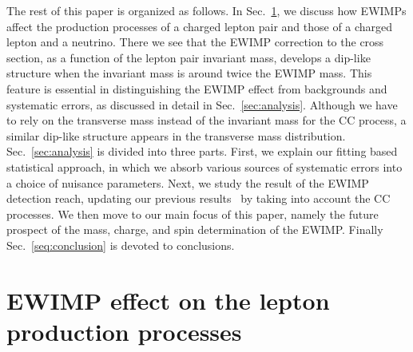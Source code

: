 \documentclass[12pt, a4paper]{article}
\begin{document}
The rest of this paper is organized as follows.  In
Sec.~\ref{sec:ewimp}, we discuss how EWIMPs affect the production
processes of a charged lepton pair and those of a charged lepton and a
neutrino.  There we see that the EWIMP correction to the cross section,
as a function of the lepton pair invariant mass, develops a dip-like
structure when the invariant mass is around twice the EWIMP mass.  This
feature is essential in distinguishing the EWIMP effect from backgrounds
and systematic errors, as discussed in detail in
Sec.~\ref{sec:analysis}.  Although we have to rely on the transverse
mass instead of the invariant mass for the CC process, a similar
dip-like structure appears in the transverse mass distribution.
Sec.~\ref{sec:analysis} is divided into three parts.  First, we explain
our fitting based statistical approach, in which we absorb various
sources of systematic errors into a choice of nuisance parameters.
Next, we study the result of the EWIMP detection reach, updating our
previous results~\cite{Chigusa:2018vxz} by taking into account the CC
processes.  We then move to our main focus of this paper, namely the
future prospect of the mass, charge, and spin determination of the
EWIMP.  Finally Sec.~\ref{seq:conclusion} is devoted to conclusions.

\section{EWIMP effect on the lepton production processes}
\label{sec:ewimp}
\end{document}
